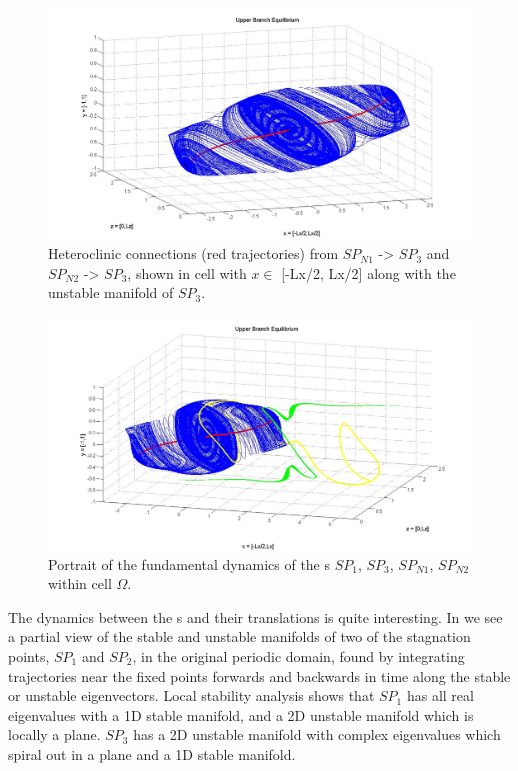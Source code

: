 \documentclass[letter,10pt,openany]{article}
\begin{document}
    \begin{figure}[!h]
\includegraphics[width=1.1\textwidth]{man14_june3.jpg}
  \caption{
   Heteroclinic connections (red trajectories) from $SP_{N1}$ -> $SP_3$ and $SP_{N2}$ -> $SP_3$, shown in cell with $x \in$ [-Lx/2, Lx/2] along with the unstable manifold of $SP_3$.
   }
  \label{eltonFig:hetero1}
 \end{figure}




  \begin{figure}[!h]
\includegraphics[width=1.1\textwidth]{june4_fig7.jpg}
  \caption{
   Portrait of the fundamental dynamics of the \stagp s $SP_1$, $SP_3$, $SP_{N1}$, $SP_{N2}$ within cell $\Omega$.
   }
  \label{eltonFig:hetero2}
 \end{figure}


 


The dynamics between the \stagp s and their translations is
   quite interesting. In  we see a partial view of the stable and unstable manifolds of two of the stagnation points, $SP_1$ and $SP_2$, in the original periodic domain, found by integrating trajectories near the fixed points forwards and backwards in time along the stable or unstable eigenvectors. Local stability analysis shows that $SP_1$ has all real eigenvalues
with a 1D stable manifold,
and a 2D unstable manifold which is locally a plane. $SP_3$
 has a 2D unstable manifold with complex eigenvalues which spiral
 out in a plane and a 1D stable manifold. 
 
\end{document}
